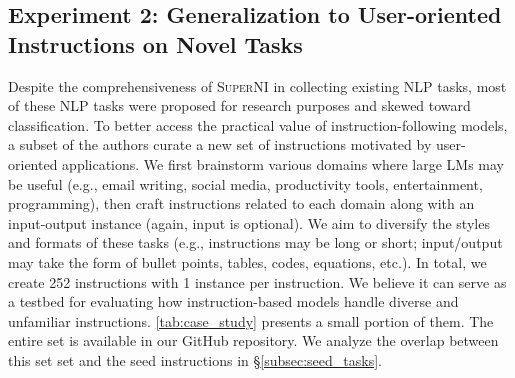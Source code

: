 \documentclass[11pt]{article}
\newcommand{\supernatShort}{\textsc{SuperNI}}
\begin{document}
\subsection{Experiment 2: Generalization to User-oriented Instructions on Novel Tasks}
\label{sec:user_instructions}

Despite the comprehensiveness of \supernatShort{} in collecting existing NLP tasks, most of these NLP tasks were proposed for research purposes and skewed toward classification. To better access the practical value of instruction-following models, a subset of the authors curate a new set of instructions motivated by user-oriented applications. 
We first brainstorm various domains where large LMs may be useful (e.g., email writing, social media, productivity tools, entertainment, programming), then craft instructions related to each domain along with an input-output instance (again, input is optional). We aim to diversify the styles and formats of these tasks (e.g., instructions may be long or short; input/output may take the form of bullet points, tables, codes, equations, etc.). In total, we create 252 instructions with 1 instance per instruction. We believe it can serve as a testbed for evaluating how instruction-based models handle diverse and unfamiliar instructions. \autoref{tab:case_study} presents a small portion of them. The entire set is available in our GitHub repository. We analyze the overlap between this set set and the seed instructions in \S\ref{subsec:seed_tasks}.
\end{document}
